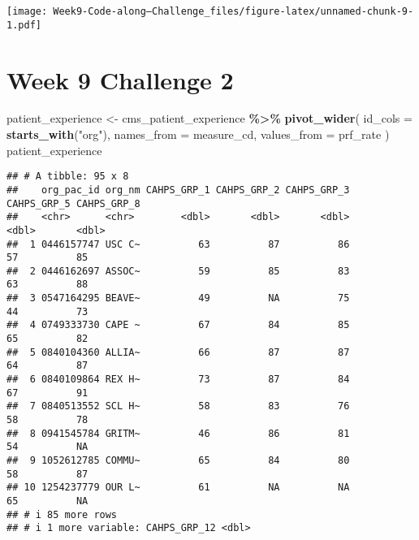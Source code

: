 \documentclass[
]{article}
\newenvironment{Shaded}{\begin{snugshade}}{\end{snugshade}}
\newcommand{\AttributeTok}[1]{\textcolor[rgb]{0.13,0.29,0.53}{#1}}
\newcommand{\FunctionTok}[1]{\textcolor[rgb]{0.13,0.29,0.53}{\textbf{#1}}}
\newcommand{\NormalTok}[1]{#1}
\newcommand{\OtherTok}[1]{\textcolor[rgb]{0.56,0.35,0.01}{#1}}
\newcommand{\SpecialCharTok}[1]{\textcolor[rgb]{0.81,0.36,0.00}{\textbf{#1}}}
\newcommand{\StringTok}[1]{\textcolor[rgb]{0.31,0.60,0.02}{#1}}
\begin{document}
\texttt{[image: Week9-Code-along---Challenge\_files/figure-latex/unnamed-chunk-9-1.pdf]}

\hypertarget{week-9-challenge-2}{%
\section{Week 9 Challenge 2}\label{week-9-challenge-2}}

\begin{Shaded}
\begin{Highlighting}[]
\NormalTok{patient\_experience }\OtherTok{\textless{}{-}}\NormalTok{ cms\_patient\_experience }\SpecialCharTok{\%\textgreater{}\%}
\FunctionTok{pivot\_wider}\NormalTok{(}
  \AttributeTok{id\_cols =} \FunctionTok{starts\_with}\NormalTok{(}\StringTok{"org"}\NormalTok{),}
\AttributeTok{names\_from =}\NormalTok{ measure\_cd,}
\AttributeTok{values\_from =}\NormalTok{ prf\_rate}
\NormalTok{)}
\NormalTok{patient\_experience}
\end{Highlighting}
\end{Shaded}

\begin{verbatim}
## # A tibble: 95 x 8
##    org_pac_id org_nm CAHPS_GRP_1 CAHPS_GRP_2 CAHPS_GRP_3 CAHPS_GRP_5 CAHPS_GRP_8
##    <chr>      <chr>        <dbl>       <dbl>       <dbl>       <dbl>       <dbl>
##  1 0446157747 USC C~          63          87          86          57          85
##  2 0446162697 ASSOC~          59          85          83          63          88
##  3 0547164295 BEAVE~          49          NA          75          44          73
##  4 0749333730 CAPE ~          67          84          85          65          82
##  5 0840104360 ALLIA~          66          87          87          64          87
##  6 0840109864 REX H~          73          87          84          67          91
##  7 0840513552 SCL H~          58          83          76          58          78
##  8 0941545784 GRITM~          46          86          81          54          NA
##  9 1052612785 COMMU~          65          84          80          58          87
## 10 1254237779 OUR L~          61          NA          NA          65          NA
## # i 85 more rows
## # i 1 more variable: CAHPS_GRP_12 <dbl>
\end{verbatim}
\end{document}
